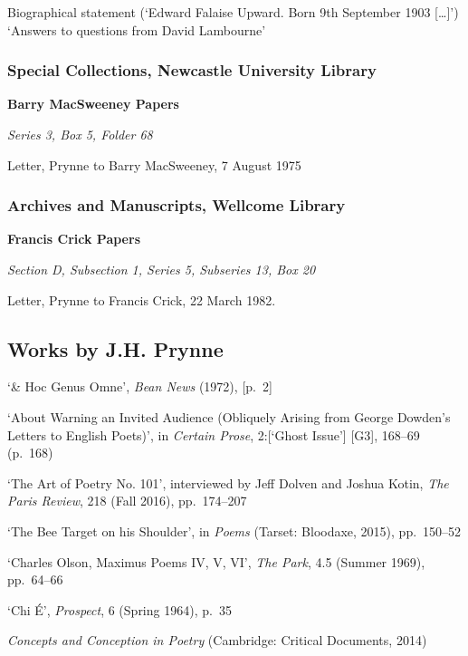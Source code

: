 \documentclass[]{article}
\begin{document}
Biographical statement (‘Edward Falaise Upward. Born 9th September 1903
{[}\ldots{}{]}’)\\
‘Answers to questions from David Lambourne’

\subsubsection{Special Collections, Newcastle University
Library}\label{special-collections-newcastle-university-library}

\textbf{Barry MacSweeney Papers}

\emph{Series 3, Box 5, Folder 68}

Letter, Prynne to Barry MacSweeney, 7 August 1975

\subsubsection{Archives and Manuscripts, Wellcome
Library}\label{archives-and-manuscripts-wellcome-library}

\textbf{Francis Crick Papers}

\emph{Section D, Subsection 1, Series 5, Subseries 13, Box 20}

Letter, Prynne to Francis Crick, 22 March 1982.

\subsection{Works by J.H. Prynne}\label{works-by-j.h.-prynne}

\setlength{\parindent}{-16pt} \setlength{\leftskip}{16pt}
\setlength{\parskip}{0pt} ‘\& Hoc Genus Omne’, \emph{Bean News} (1972),
{[}p.~2{]}

‘About Warning an Invited Audience (Obliquely Arising from George
Dowden’s Letters to English Poets)’, in \emph{Certain Prose},
2:{[}‘Ghost Issue’{]} {[}G3{]}, 168–69 (p.~168)

‘The Art of Poetry No. 101’, interviewed by Jeff Dolven and Joshua
Kotin, \emph{The Paris Review}, 218 (Fall 2016), pp.~174–207

‘The Bee Target on his Shoulder’, in \emph{Poems} (Tarset: Bloodaxe,
2015), pp.~150–52

‘Charles Olson, Maximus Poems IV, V, VI’, \emph{The Park}, 4.5 (Summer
1969), pp.~64–66

‘Chi É’, \emph{Prospect}, 6 (Spring 1964), p.~35

\emph{Concepts and Conception in Poetry} (Cambridge: Critical Documents,
2014)
\end{document}

